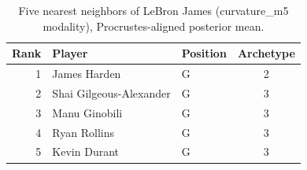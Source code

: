 \begin{table}[htbp]
  \centering\small
  \begin{tabular}{rllc}
    \toprule
    Rank & Player & Position & Archetype \\
    \midrule
    1 & James Harden & G & 2 \\
    2 & Shai Gilgeous-Alexander & G & 3 \\
    3 & Manu Ginobili & G & 3 \\
    4 & Ryan Rollins & G & 3 \\
    5 & Kevin Durant & G & 3 \\
    \bottomrule
  \end{tabular}
  \caption{Five nearest neighbors of LeBron James (curvature_m5 modality), Procrustes-aligned posterior mean.}
  \label{tab:LeBron_James_neighbors_curvature_m5}
\end{table}

